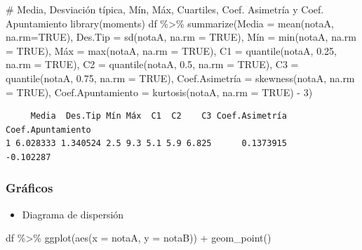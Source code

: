 \documentclass[
  a4paper,
]{scrreport}
\newenvironment{Shaded}{\begin{snugshade}}{\end{snugshade}}
\newcommand{\AttributeTok}[1]{\textcolor[rgb]{0.40,0.45,0.13}{#1}}
\newcommand{\CommentTok}[1]{\textcolor[rgb]{0.37,0.37,0.37}{#1}}
\newcommand{\ConstantTok}[1]{\textcolor[rgb]{0.56,0.35,0.01}{#1}}
\newcommand{\DecValTok}[1]{\textcolor[rgb]{0.68,0.00,0.00}{#1}}
\newcommand{\FloatTok}[1]{\textcolor[rgb]{0.68,0.00,0.00}{#1}}
\newcommand{\FunctionTok}[1]{\textcolor[rgb]{0.28,0.35,0.67}{#1}}
\newcommand{\NormalTok}[1]{\textcolor[rgb]{0.00,0.23,0.31}{#1}}
\newcommand{\OtherTok}[1]{\textcolor[rgb]{0.00,0.23,0.31}{#1}}
\newcommand{\SpecialCharTok}[1]{\textcolor[rgb]{0.37,0.37,0.37}{#1}}
\providecommand{\tightlist}{%
  \setlength{\itemsep}{0pt}\setlength{\parskip}{0pt}}\usepackage{longtable,booktabs,array}
\theoremstyle{definition}
\theoremstyle{definition}
\theoremstyle{remark}
\begin{document}
\begin{Shaded}
\begin{Highlighting}[]
\CommentTok{\# Media, Desviación típica, Mín, Máx, Cuartiles, Coef. Asimetría y Coef. Apuntamiento}
\FunctionTok{library}\NormalTok{(moments)}
\NormalTok{df }\SpecialCharTok{\%\textgreater{}\%} \FunctionTok{summarize}\NormalTok{(}\AttributeTok{Media =} \FunctionTok{mean}\NormalTok{(notaA, }\AttributeTok{na.rm=}\ConstantTok{TRUE}\NormalTok{), }\AttributeTok{Des.Tip =} \FunctionTok{sd}\NormalTok{(notaA, }\AttributeTok{na.rm =} \ConstantTok{TRUE}\NormalTok{), Mín }\OtherTok{=} \FunctionTok{min}\NormalTok{(notaA, }\AttributeTok{na.rm =} \ConstantTok{TRUE}\NormalTok{), Máx }\OtherTok{=} \FunctionTok{max}\NormalTok{(notaA, }\AttributeTok{na.rm =} \ConstantTok{TRUE}\NormalTok{), }\AttributeTok{C1 =} \FunctionTok{quantile}\NormalTok{(notaA, }\FloatTok{0.25}\NormalTok{, }\AttributeTok{na.rm =} \ConstantTok{TRUE}\NormalTok{), }\AttributeTok{C2 =} \FunctionTok{quantile}\NormalTok{(notaA, }\FloatTok{0.5}\NormalTok{, }\AttributeTok{na.rm =} \ConstantTok{TRUE}\NormalTok{), }\AttributeTok{C3 =} \FunctionTok{quantile}\NormalTok{(notaA, }\FloatTok{0.75}\NormalTok{, }\AttributeTok{na.rm =} \ConstantTok{TRUE}\NormalTok{), Coef.Asimetría }\OtherTok{=} \FunctionTok{skewness}\NormalTok{(notaA, }\AttributeTok{na.rm =} \ConstantTok{TRUE}\NormalTok{), }\AttributeTok{Coef.Apuntamiento =} \FunctionTok{kurtosis}\NormalTok{(notaA, }\AttributeTok{na.rm =} \ConstantTok{TRUE}\NormalTok{) }\SpecialCharTok{{-}} \DecValTok{3}\NormalTok{)}
\end{Highlighting}
\end{Shaded}

\begin{verbatim}
     Media  Des.Tip Mín Máx  C1  C2    C3 Coef.Asimetría Coef.Apuntamiento
1 6.028333 1.340524 2.5 9.3 5.1 5.9 6.825      0.1373915         -0.102287
\end{verbatim}

\subsubsection{Gráficos}\label{gruxe1ficos-5}

\begin{itemize}
\tightlist
\item
  Diagrama de dispersión
\end{itemize}

\begin{Shaded}
\begin{Highlighting}[]
\NormalTok{df }\SpecialCharTok{\%\textgreater{}\%} \FunctionTok{ggplot}\NormalTok{(}\FunctionTok{aes}\NormalTok{(}\AttributeTok{x =}\NormalTok{ notaA, }\AttributeTok{y =}\NormalTok{ notaB)) }\SpecialCharTok{+} 
  \FunctionTok{geom\_point}\NormalTok{()}
\end{Highlighting}
\end{Shaded}
\end{document}
